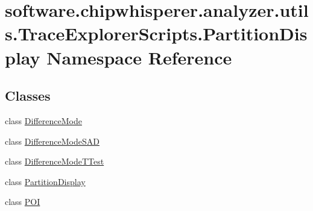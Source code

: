 \hypertarget{namespacesoftware_1_1chipwhisperer_1_1analyzer_1_1utils_1_1TraceExplorerScripts_1_1PartitionDisplay}{}\section{software.\+chipwhisperer.\+analyzer.\+utils.\+Trace\+Explorer\+Scripts.\+Partition\+Display Namespace Reference}
\label{namespacesoftware_1_1chipwhisperer_1_1analyzer_1_1utils_1_1TraceExplorerScripts_1_1PartitionDisplay}
\subsection*{Classes}
\begin{DoxyCompactItemize}
\item 
class \hyperlink{classsoftware_1_1chipwhisperer_1_1analyzer_1_1utils_1_1TraceExplorerScripts_1_1PartitionDisplay_1_1DifferenceMode}{Difference\+Mode}
\item 
class \hyperlink{classsoftware_1_1chipwhisperer_1_1analyzer_1_1utils_1_1TraceExplorerScripts_1_1PartitionDisplay_1_1DifferenceModeSAD}{Difference\+Mode\+S\+A\+D}
\item 
class \hyperlink{classsoftware_1_1chipwhisperer_1_1analyzer_1_1utils_1_1TraceExplorerScripts_1_1PartitionDisplay_1_1DifferenceModeTTest}{Difference\+Mode\+T\+Test}
\item 
class \hyperlink{classsoftware_1_1chipwhisperer_1_1analyzer_1_1utils_1_1TraceExplorerScripts_1_1PartitionDisplay_1_1PartitionDisplay}{Partition\+Display}
\item 
class \hyperlink{classsoftware_1_1chipwhisperer_1_1analyzer_1_1utils_1_1TraceExplorerScripts_1_1PartitionDisplay_1_1POI}{P\+O\+I}
\end{DoxyCompactItemize}
